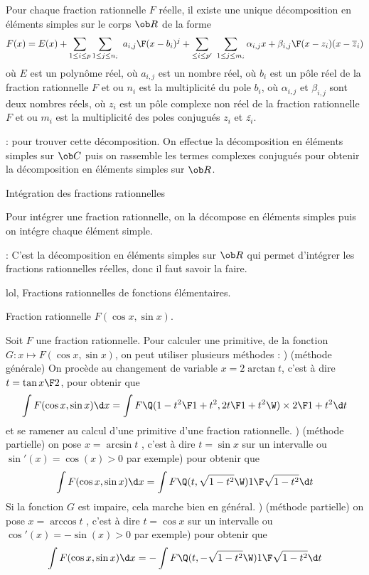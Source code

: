 \Propriete []  Pour chaque fraction rationnelle $F$ r\'eelle, il existe une unique d\'ecomposition en \'el\'ements simples 
sur le corps $\ob R$ de la forme
$$
F(x)=E(x)+\sum_{1\le i\le p}\sum_{1\le j\le n_i}\ {a_{i,j}\F (x-b_i)^j}
+\sum_{\le i\le p'}\ \sum_{1\le j\le m_i}{\alpha_{i,j}x+\beta_{i,j}\F (x-z_i)(x-\overline z_i)}
$$
o\`u $E$ est un polyn\^ome r\'eel, o\`u $a_{i,j}$ est un nombre r\'eel, o\`u $b_i$ est un p\^ole r\'eel de la fraction
rationnelle $F$ et ou $n_i$ est la multiplicit\'e du pole $b_i$, o\`u $\alpha_{i,j}$ et $\beta_{i,j}$ sont deux nombres r\'eels, o\`u $z_i$ est un p\^ole complexe non r\'eel de la fraction
rationnelle $F$ et ou $m_i$ est la multiplicit\'e des poles conjugu\'es $z_i$ et $\overline{z_i}$.
\bigskip

\Remarque : pour trouver cette d\'ecomposition. On effectue la d\'ecomposition en \'el\'ements simples sur $\ob C$ puis on rassemble les termes complexes conjugu\'es pour obtenir la d\'ecomposition 
en \'el\'ements simples sur $\ob R$. 
\bigskip

\Concept [Index=Primitives!des fractions rationnelles] Int\'egration des fractions rationnelles

Pour int\'egrer une fraction rationnelle, on la d\'ecompose en \'el\'ements simples puis on int\'egre chaque \'el\'ement simple.
\medskip

\Remarque : C'est la d\'ecomposition en \'el\'ements simples sur $\ob R$ qui permet d'int\'egrer les fractions rationnelles r\'eelles, donc il faut savoir la faire. 
\bigskip

\Subsection lol, Fractions rationnelles de fonctions \'el\'ementaires. 

\Concept [Index=Primitives!des fonctions du type@des fonctions du type $F(\cos x,\sin x)$] Fraction rationnelle $F(\cos x,\sin x)$. 

\Propriete []  Soit $F$ une fraction rationnelle. Pour calculer une primitive, de la fonction $G:x\mapsto F(\cos x,\sin x)$, on peut utiliser plusieurs m\'ethodes : ) (m\'ethode g\'en\'erale) On proc\`ede au changement de variable $x=2\arctan t$, \pn c'est \`a dire $t=\tan{x\F2}$, pour obtenir que 
$$
\int F(\cos x,\sin x)\d x=\int F\Q({1-t^2\F1+t^2},{2t\F 1+t^2}\W)\times{2\F1+t^2}\d t
$$
et se ramener au calcul d'une primitive d'une fraction rationnelle. 
\medskip
{}) (m\'ethode partielle) on pose $x=\arcsin t$ , c'est \`a dire $t=\sin x$ sur un intervalle ou $\sin'(x)=\cos(x)>0$ par exemple) pour obtenir que 
$$
\int F(\cos x,\sin x)\d x=\int F\Q(t,\sqrt{1-t^2}\W){1\F\sqrt{1-t^2}}\d t
$$
Si la fonction $G$ est impaire, cela marche bien en g\'en\'eral. 
\medskip
{}) (m\'ethode partielle) on pose $x=\arccos t$ , c'est \`a dire $t=\cos x$ sur un intervalle ou $\cos'(x)=-\sin(x)> 0$ par exemple) pour obtenir que 
$$
\int F(\cos x,\sin x)\d x=-\int F\Q(t,-\sqrt{1-t^2}\W){1\F\sqrt{1-t^2}}\d t
$$


